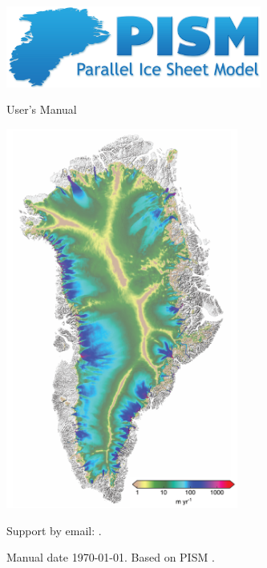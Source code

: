 \documentclass[titlepage,letterpaper,final]{scrartcl}
\begin{document}
\graphicspath{{figs/}}

\begin{titlepage}

  \begin{center}

    \includegraphics[width=3.3in,keepaspectratio=true]{pism-logo}

    \vspace{2.0cm}
    {\Huge {} User's Manual}
    \vspace{2.0cm}

    \includegraphics[width=3.0in,keepaspectratio=true]{gris-flow-600m}

    \vfill

    \small Support by email: \PISMEMAIL.
    \medskip

    Manual date \today. Based on PISM \PISMREV.
    \medskip

    \PISMDOWNLOADMSG
  \end{center}
\end{titlepage}

\newpage
\phantom{bob}
\end{document}
